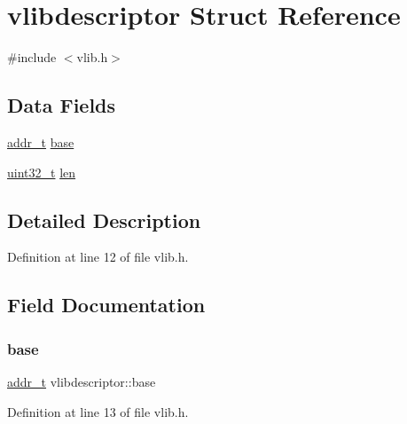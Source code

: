 \hypertarget{a00254}{}\section{vlibdescriptor Struct Reference}
\label{a00254}


{\ttfamily \#include $<$vlib.\+h$>$}

\subsection*{Data Fields}
\begin{DoxyCompactItemize}
\item 
\hyperlink{a00116_a295f71165288684c38c6bb836fbb3c59_a295f71165288684c38c6bb836fbb3c59}{addr\+\_\+t} \hyperlink{a00254_a0a6151ac18d60c648baec065efc9af1a_a0a6151ac18d60c648baec065efc9af1a}{base}
\item 
\hyperlink{a00116_a435d1572bf3f880d55459d9805097f62_a435d1572bf3f880d55459d9805097f62}{uint32\+\_\+t} \hyperlink{a00254_a1cebf64c2c1ec72bca5cf673be70b3a7_a1cebf64c2c1ec72bca5cf673be70b3a7}{len}
\end{DoxyCompactItemize}


\subsection{Detailed Description}


Definition at line 12 of file vlib.\+h.



\subsection{Field Documentation}
\mbox{\label{a00254_a0a6151ac18d60c648baec065efc9af1a_a0a6151ac18d60c648baec065efc9af1a}} 
\subsubsection{\texorpdfstring{base}{base}}
{\footnotesize\ttfamily \hyperlink{a00116_a295f71165288684c38c6bb836fbb3c59_a295f71165288684c38c6bb836fbb3c59}{addr\+\_\+t} vlibdescriptor\+::base}



Definition at line 13 of file vlib.\+h.

\mbox{\label{a00254_a1cebf64c2c1ec72bca5cf673be70b3a7_a1cebf64c2c1ec72bca5cf673be70b3a7}} 
